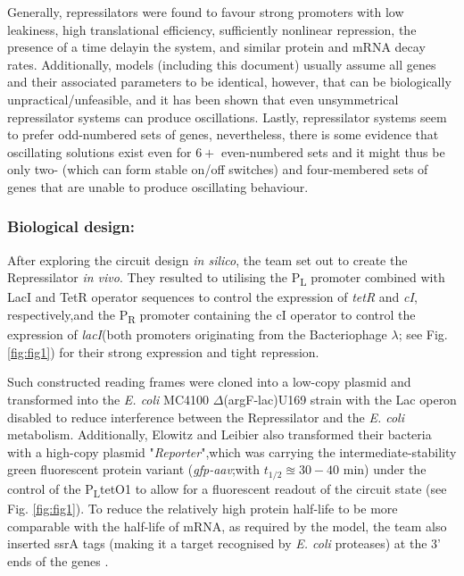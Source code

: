 \documentclass[runningheads,a4paper]{llncs}
\begin{document}
Generally, repressilators were found to favour strong promoters with low leakiness, high translational efficiency, sufficiently nonlinear repression, the presence of a time delay\linebreak in the system, and similar protein and mRNA decay rates. Additionally, models (including this document) usually assume all genes and their associated parameters to be identical\cite{Purcell2010a}, however, that can be biologically unpractical/unfeasible, and it has been shown that even unsymmetrical repressilator systems can produce oscillations\cite{Strelkowa2010}. Lastly, repressilator systems seem to prefer odd-numbered sets of genes, nevertheless, there is some evidence that oscillating solutions exist even for $6+$ even-numbered sets and it might thus be only two- (which can form stable on/off switches) and four-membered sets of genes that are unable to produce oscillating behaviour\cite{Purcell2010a,Strelkowa2010}.

\subsubsection*{Biological design:} 
After exploring the circuit design \textit{in silico}, the team set out to create the Repressilator \textit{in vivo}. They resulted to utilising the P\textsubscript{L} promoter  combined with LacI and TetR operator sequences to control the expression of \textit{tetR} and \textit{cI}, respectively,\linebreak and the P\textsubscript{R} promoter containing the cI operator to control the expression of \textit{lacI}\linebreak (both promoters originating from the Bacteriophage $\lambda$; see Fig. \ref{fig:fig1}) for their strong expression and tight repression\cite{Elowitz2000d}. 

Such constructed reading frames were cloned into a low-copy plasmid and transformed into the \textit{E. coli} MC4100 $\Delta$(argF-lac)U169 strain with the Lac operon disabled to reduce interference between the Repressilator and the \textit{E. coli} metabolism\cite{Elowitz2000d}. Additionally, Elowitz and Leibier also transformed their bacteria with a high-copy plasmid "\textit{Reporter}",\linebreak which was carrying the intermediate-stability green fluorescent protein variant (\textit{gfp-aav};\linebreak with $t_{1/2} \approxeq 30-40$ min)\cite{Andersen1998} under the control of the P\textsubscript{L}tetO1 to allow for a fluorescent readout of the circuit state (see Fig. \ref{fig:fig1})\cite{Elowitz2000d}. To reduce the relatively high protein half-life to be more comparable with the half-life of mRNA, as required by the model, the team also inserted ssrA tags (making it a target recognised by \textit{E. coli} proteases) at the 3' ends of the genes \cite{Elowitz2000d}.
\end{document}
